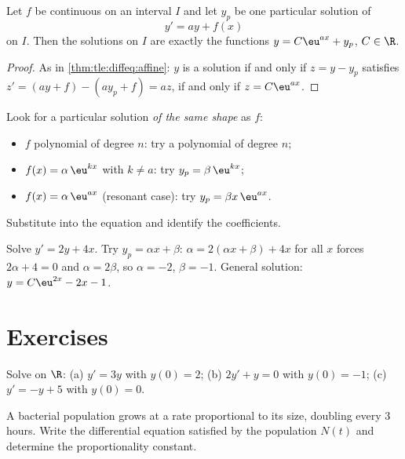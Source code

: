 \begin{proposition}\label{prop:tle:diffeq:general}
Let $f$ be continuous on an interval $I$ and let $y_p$ be one particular
solution of
\[
y' = ay + f(x)
\]
on $I$. Then the solutions on $I$ are exactly the functions
$y = C\eu^{ax} + y_p$, $C \in \R$.
\end{proposition}

\begin{proof}
As in \cref{thm:tle:diffeq:affine}: $y$ is a solution if and only if
$z = y - y_p$ satisfies
$z' = (ay + f) - (ay_p + f) = az$, if and only if $z = C\eu^{ax}$.
\end{proof}

\begin{method}\label{met:tle:diffeq:particular}
Look for a particular solution \emph{of the same shape} as $f$:
\begin{itemize}
  \item $f$ polynomial of degree $n$: try a polynomial of degree $n$;
  \item $f(x) = \alpha\,\eu^{kx}$ with $k \neq a$: try $y_p = \beta\,\eu^{kx}$;
  \item $f(x) = \alpha\,\eu^{ax}$ (resonant case): try
        $y_p = \beta x\,\eu^{ax}$.
\end{itemize}
Substitute into the equation and identify the coefficients.
\end{method}

\begin{example}\label{ex:tle:diffeq:particular}
Solve $y' = 2y + 4x$. Try $y_p = \alpha x + \beta$:
$\alpha = 2(\alpha x + \beta) + 4x$ for all $x$ forces
$2\alpha + 4 = 0$ and $\alpha = 2\beta$, so $\alpha = -2$, $\beta = -1$.
General solution: $y = C\eu^{2x} - 2x - 1$.
\end{example}

\section{Exercises}

\begin{exercise}[$\star$]\label{exo:tle:diffeq:1}
Solve on $\R$:
(a) $y' = 3y$ with $y(0) = 2$;\quad
(b) $2y' + y = 0$ with $y(0) = -1$;\quad
(c) $y' = -y + 5$ with $y(0) = 0$.
\end{exercise}

\begin{exercise}[$\star$]\label{exo:tle:diffeq:2}
A bacterial population grows at a rate proportional to its size, doubling
every $3$ hours. Write the differential equation satisfied by the population
$N(t)$ and determine the proportionality constant.
\end{exercise}

